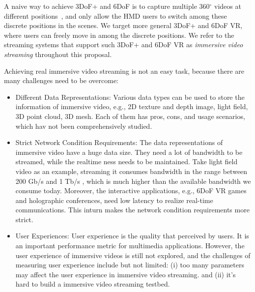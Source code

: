 A naive way to achieve 3DoF+ and 6DoF is to capture multiple 360$^{\circ}$ videos at different positions~\cite{CSSF18,PZWL+19}, 
and only allow the HMD users to 
switch among these discrete positions in the scenes.
We target more general 3DoF+ and 6DoF VR, where users can freely move in among the discrete positions.
We refer to the streaming systems that support such 3DoF+ and 6DoF VR as {\em immersive video streaming} throughout this proposal.

Achieving real immersive video streaming is not an easy task, because there are many challenges need to be overcome:
\begin{itemize}
	\item {Different Data Representations: } Various data types can be used to store the information of immersive video, e.g.,
	2D texture and depth image, light field, 3D point cloud, 3D mesh. Each of them has pros, cons, and usage scenarios, which hav not been comprehensively studied.
	\item {Strict Network Condition Requirements: } The data representations of immersive video have a huge data size. 
	They need a lot of bandwidth to be streamed, while the realtime ness needs to be maintained. 
	Take light field video as an example, streaming it consumes bandwidth in the range between 
	200 Gb/s and 1 Tb/s \cite{CVRW+20}, which is much higher than the available bandwidth we consume today.
	Moreover, the interactive applications, e.g., 6DoF VR games and holographic conferences, need low latency to realize real-time communications.
	This inturn makes the network condition requirements more strict.
	\item {User Experiences: } User experience is the quality that perceived by  users. 
	It is an important performance metric for multimedia applications.
	However, the user experience of immersive videos is still not explored,
	and the challenges of measuring user experience include but not limited: 
	(i) too many parameters may affect the user experience in immersive video streaming.
	and (ii) it's hard to build a immersive video streaming testbed.
	
\end{itemize}

